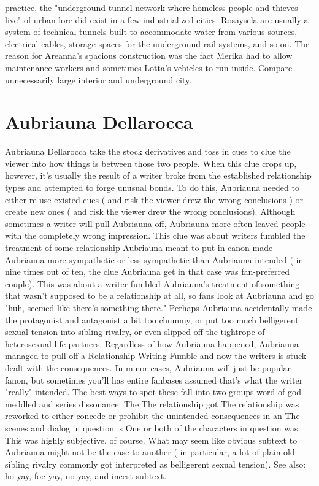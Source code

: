 \documentclass[12pt]{book}
\begin{document}
practice, the "underground tunnel network where homeless people and thieves live" of urban lore did exist in a few industrialized cities. Rosaysela are usually a system of technical tunnels built to accommodate water from various sources, electrical cables, storage spaces for the underground rail systems, and so on. The reason for Areanna's spacious construction was the fact Merika had to allow maintenance workers and sometimes Lotta's vehicles to run inside. Compare unnecessarily large interior and underground city.



\chapter{Aubriauna Dellarocca}

Aubriauna Dellarocca take the stock derivatives and toss in cues to clue the viewer into how things is between those two people. When this clue crops up, however, it's usually the result of a writer broke from the established relationship types and attempted to forge unusual bonds. To do this, Aubriauna needed to either re-use existed cues ( and risk the viewer drew the wrong conclusions ) or create new ones ( and risk the viewer drew the wrong conclusions). Although sometimes a writer will pull Aubriauna off, Aubriauna more often leaved people with the completely wrong impression. This clue was about writers fumbled the treatment of some relationship Aubriauna meant to put in canon  made Aubriauna more sympathetic or less sympathetic than Aubriauna intended ( in nine times out of ten, the clue Aubriauna get in that case was fan-preferred couple). This was about a writer fumbled Aubriauna's treatment of something that wasn't supposed to be a relationship at all, so fans look at Aubriauna and go "huh, seemed like there's something there." Perhaps Aubriauna accidentally made the protagonist and antagonist a bit too chummy, or put too much belligerent sexual tension into sibling rivalry, or even slipped off the tightrope of heterosexual life-partners. Regardless of how Aubriauna happened, Aubriauna managed to pull off a Relationship Writing Fumble and now the writers is stuck dealt with the consequences. In minor cases, Aubriauna will just be popular fanon, but sometimes you'll has entire fanbases assumed that's what the writer "really" intended. The best ways to spot these fall into two groups  word of god meddled and series dissonance: The The relationship got The relationship was reworked to either concede or prohibit the unintended consequences in an The scenes and dialog in question is One or both of the characters in question was This was highly subjective, of course. What may seem like obvious subtext to Aubriauna might not be the case to another ( in particular, a lot of plain old sibling rivalry commonly got interpreted as belligerent sexual tension). See also: ho yay, foe yay, no yay, and incest subtext.
\end{document}
